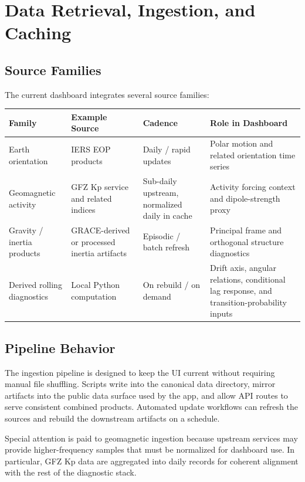\documentclass[11pt]{article}
\begin{document}
\section{Data Retrieval, Ingestion, and Caching}
\subsection{Source Families}
The current dashboard integrates several source families:
\begin{longtable}{>{\raggedright\arraybackslash}p{} >{\raggedright\arraybackslash}p{} >{\raggedright\arraybackslash}p{} >{\raggedright\arraybackslash}p{}}
\toprule
\textbf{Family} & \textbf{Example Source} & \textbf{Cadence} & \textbf{Role in Dashboard} \\
\midrule
Earth orientation & IERS EOP products & Daily / rapid updates & Polar motion and related orientation time series \\
Geomagnetic activity & GFZ Kp service and related indices & Sub-daily upstream, normalized daily in cache & Activity forcing context and dipole-strength proxy \\
Gravity / inertia products & GRACE-derived or processed inertia artifacts & Episodic / batch refresh & Principal frame and orthogonal structure diagnostics \\
Derived rolling diagnostics & Local Python computation & On rebuild / on demand & Drift axis, angular relations, conditional lag response, and transition-probability inputs \\
\bottomrule
\end{longtable}

\subsection{Pipeline Behavior}
The ingestion pipeline is designed to keep the UI current without requiring manual file shuffling. Scripts write into the canonical data directory, mirror artifacts into the public data surface used by the app, and allow API routes to serve consistent combined products. Automated update workflows can refresh the sources and rebuild the downstream artifacts on a schedule.

Special attention is paid to geomagnetic ingestion because upstream services may provide higher-frequency samples that must be normalized for dashboard use. In particular, GFZ Kp data are aggregated into daily records for coherent alignment with the rest of the diagnostic stack.
\end{document}
